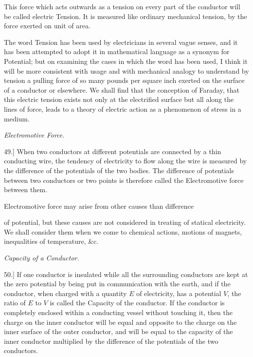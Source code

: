 \documentclass[11pt,a4paper]{article}
\begin{document}
This force which acts outwards as a tension on every part of the
conductor will be called electric Tension. It is measured like ordinary
mechanical tension, by the force exerted on unit of area.

The word Tension has been used by electricians in several vague senses,
and it has been attempted to adopt it in mathematical language as a
synonym for Potential; but on examining the cases in which the word has
been used, I think it will be more consistent with usage and with
mechanical analogy to understand by tension a pulling force of so many
pounds per square inch exerted on the surface of a conductor or
elsewhere. We shall find that the conception of Faraday, that this
electric tension exists not only at the electrified surface but all
along the lines of force, leads to a theory of electric action as a
phenomenon of stress in a medium.

\begin{center}
\textit{Electromotive Force.}
\end{center}

49.] When two conductors at different potentials are connected by a thin
conducting wire, the tendency of electricity to flow along the wire is
measured by the difference of the potentials of the two bodies. The
difference of potentials between two conductors or two points is
therefore called the Electromotive force between them.

Electromotive force may arise from other causes than difference

\clearpage
\setcounter{footnote}{0}

of potential, but these causes are not considered in treating of
statical electricity. We shall consider them when we come to chemical
actions, motions of magnets, inequalities of temperature, \&c.

\begin{center}
\textit{Capacity of a Conductor.}
\end{center}

50.] If one conductor is insulated while all the surrounding conductors
are kept at the zero potential by being put in communication with the
earth, and if the conductor, when charged with a quantity \(E\) of
electricity, has a potential \(V\), the ratio of \(E\) to \(V\) is
called the Capacity of the conductor. If the conductor is completely
enclosed within a conducting vessel without touching it, then the charge
on the inner conductor will be equal and opposite to the charge on the
inner surface of the outer conductor, and will be equal to the capacity
of the inner conductor multiplied by the difference of the potentials of
the two conductors.
\end{document}
